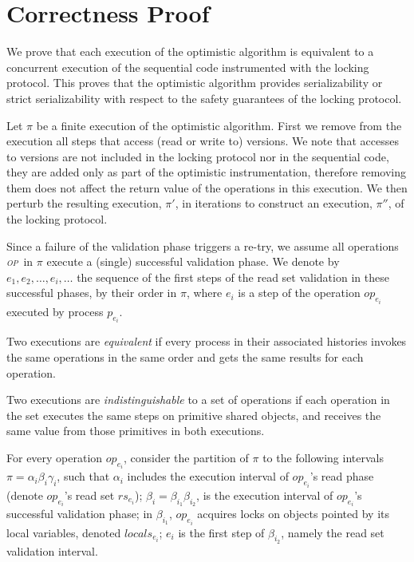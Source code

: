 \newcommand{\op}{\emph{\textsc{op}}}
\newcommand{\opt}{\textsc{opt}}

\section{Correctness Proof}
\label{sec:proof}

We prove that each execution of the optimistic algorithm is equivalent to a
concurrent execution of the sequential code instrumented with the locking
protocol. 
This proves that the optimistic algorithm provides serializability or strict
serializability with respect to the safety guarantees of the locking protocol.

Let $\pi$ be a finite execution of the optimistic algorithm. 
First we remove from the execution all steps that access (read or write to)
versions. We note that accesses to versions are not included in the locking
protocol nor in the sequential code, they are added only as part of the
optimistic instrumentation, therefore removing them does not affect the return
value of the operations in this execution.  We then perturb the resulting execution, $\pi'$, in iterations to
construct an execution, $\pi''$, of the locking protocol.

Since a failure of the validation phase triggers a re-try, we assume all
operations \op\ in $\pi$ execute a (single) successful validation phase. We
denote by $e_1, e_2, \ldots, e_i, \ldots$ the sequence of the first steps of the
read set validation in these successful phases, by their order in
$\pi$, where $e_i$ is a step of the operation $op_{e_i}$ executed by process $p_{e_i}$.

Two executions are \emph{equivalent} if every process in their associated
histories invokes the same operations in the same order and gets the
same results for each operation.

Two executions are \emph{indistinguishable} to a set of operations if each
operation in the set executes the same steps on primitive shared objects, and
receives the same value from those primitives in both executions. 

For every operation $op_{e_i}$, consider the partition of $\pi$ to
the following intervals $\pi=\alpha_i\beta_i\gamma_i$, such that
$\alpha_i$ includes the execution interval of $op_{e_i}$'s read phase (denote
$op_{e_i}$'s read set $rs_{e_i}$); $\beta_i=\beta_{i_1}\beta_{i_2}$, is the
execution interval of $op_{e_i}$'s successful validation phase; in
$\beta_{i_1}$, $op_{e_i}$ acquires 
locks on objects pointed by its local variables, denoted $locals_{e_i}$; 
$e_i$ is the first step of $\beta_{i_2}$, namely the read set validation
interval.

